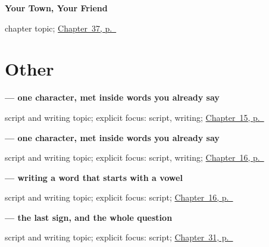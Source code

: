 \noindent\begin{minipage}[t]{\linewidth}
\raggedright
\textbf{Your Town, Your Friend}\par
\footnotesize chapter topic; \hyperref[ch:ta-your-town-your-friend]{Chapter~37, p.~\pageref*{ch:ta-your-town-your-friend}}
\end{minipage}\par\smallskip

\section*{Other}

\noindent\begin{minipage}[t]{\linewidth}
\raggedright
\textbf{ — one character, met inside words you already say}\par
\footnotesize script and writing topic; explicit focus: script, writing; \hyperref[ch:ta-water-and-rice]{Chapter~15, p.~\pageref*{ch:ta-water-and-rice}}
\end{minipage}\par\smallskip

\noindent\begin{minipage}[t]{\linewidth}
\raggedright
\textbf{ — one character, met inside words you already say}\par
\footnotesize script and writing topic; explicit focus: script, writing; \hyperref[ch:ta-tamil-months]{Chapter~16, p.~\pageref*{ch:ta-tamil-months}}
\end{minipage}\par\smallskip

\noindent\begin{minipage}[t]{\linewidth}
\raggedright
\textbf{ — writing a word that starts with a vowel}\par
\footnotesize script and writing topic; explicit focus: script; \hyperref[ch:ta-tamil-months]{Chapter~16, p.~\pageref*{ch:ta-tamil-months}}
\end{minipage}\par\smallskip

\noindent\begin{minipage}[t]{\linewidth}
\raggedright
\textbf{ — the last sign, and the whole question}\par
\footnotesize script and writing topic; explicit focus: script; \hyperref[ch:ta-good-afternoon]{Chapter~31, p.~\pageref*{ch:ta-good-afternoon}}
\end{minipage}\par\smallskip

